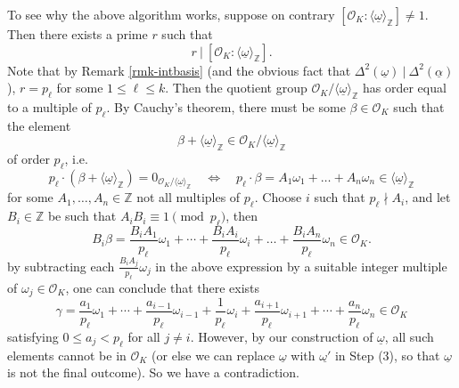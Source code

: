 To see why the above algorithm works, suppose on contrary $[\mathcal{O}_K: \langle \underline{\omega} \rangle_{\mathbb{Z}}] \neq 1$. Then there exists a prime $r$ such that 
$$r\ |\ [\mathcal{O}_K: \langle \underline{\omega} \rangle_{\mathbb{Z}}].$$ 
Note that by Remark \ref{rmk-intbasis} (and the obvious fact that $\Delta^2(\underline{\omega})\ |\ \Delta^2(\underline{\alpha})$), 
$r = p_{\ell}$ for some $1 \leq \ell \leq k$. Then the quotient group $\mathcal{O}_K/\langle \underline{\omega} \rangle_{\mathbb{Z}}$ has order equal to a multiple of $p_{\ell}$. By Cauchy's theorem, there must be some $\beta \in \mathcal{O}_K$ such that the element 
            $$\beta +  \langle \underline{\omega} \rangle_{\mathbb{Z}} \in  \mathcal{O}_K/\langle \underline{\omega} \rangle_{\mathbb{Z}}$$
    of order $p_{\ell}$, i.e. 
    $$p_{\ell} \cdot (\beta + \langle \underline{\omega} \rangle_{\mathbb{Z}}) = 0_{\mathcal{O}_K/\langle \underline{\omega} \rangle_{\mathbb{Z}}}  \quad \Leftrightarrow \quad p_{\ell}\cdot \beta = A_1 \omega_1 + \dots + A_n \omega_n \in \langle \underline{\omega} \rangle_{\mathbb{Z}}$$
    for some $A_1, \dots, A_n \in \mathbb{Z}$ not all multiples of $p_{\ell}$. Choose $i$ such that $p_{\ell}\nmid A_i$, and let $B_i \in \mathbb{Z}$ be such that $A_iB_i \equiv 1 \pmod{p_{\ell}}$, then 
    $$B_i \beta = \frac{B_iA_1}{p_{\ell}}\omega_1+\cdots+\frac{B_iA_i}{p_{\ell}}\omega_i+\dots+\frac{B_iA_n}{p_{\ell}}\omega_n \in \mathcal{O}_K.$$
by subtracting each $\frac{B_iA_j}{p_{\ell}}\omega_j$ in the above expression by a suitable integer multiple of $\omega_j \in \mathcal{O}_K$, one can conclude that there exists
$$\gamma =\frac{a_1}{p_{\ell}}\omega_1+\cdots+\frac{a_{i-1}}{p_{\ell}}\omega_{i-1}+\frac{1}{p_{\ell}}\omega_i+\frac{a_{i+1}}{p_{\ell}}\omega_{i+1}+\cdots+\frac{a_n}{p_{\ell}}\omega_n \in \mathcal{O}_K$$
satisfying $0 \leq a_j < p_{\ell}$ for all $j \neq i$. However, by our construction of $\underline{\omega}$, all such elements cannot be in $\mathcal{O}_K$ (or else we can replace $\underline{\omega}$ with $\underline{\omega'}$ in Step (3), so that $\underline{\omega}$ is not the final outcome). So we have a contradiction.

